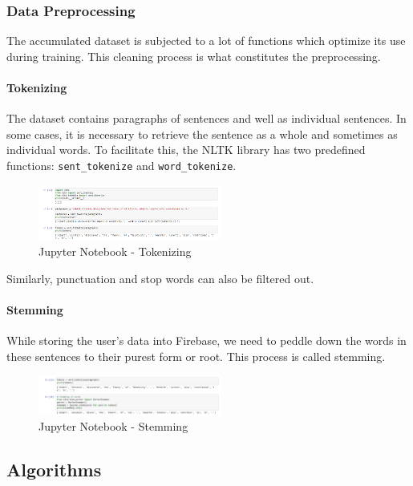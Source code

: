 \documentclass[conference,compsoc]{IEEEtran}
\begin{document}
\subsubsection{Data Preprocessing}

The accumulated dataset is subjected to a lot of functions which optimize its use during training. This cleaning process is what constitutes the preprocessing.

\paragraph{Tokenizing}
The dataset contains paragraphs of sentences and well as individual sentences. In some cases, it is necessary to retrieve the sentence as a whole and sometimes as individual words. To facilitate this, the NLTK library has two predefined functions: \texttt{sent\_tokenize} and \texttt{word\_tokenize}.

\begin{figure}[H]
    \centering
    \includegraphics[width=6cm]{screenshots/jupyter-notebook/tokenizing.png}
    \caption{Jupyter Notebook - Tokenizing}
\end{figure}

Similarly, punctuation and stop words can also be filtered out.

\paragraph{Stemming}
While storing the user’s data into Firebase, we need to peddle down the words in these sentences to their purest form or root. This process is called stemming.

\begin{figure}[H]
    \centering
    \includegraphics[width=6cm]{screenshots/jupyter-notebook/stemming.png}
    \caption{Jupyter Notebook - Stemming}
\end{figure}

\subsection{Algorithms}
\end{document}

